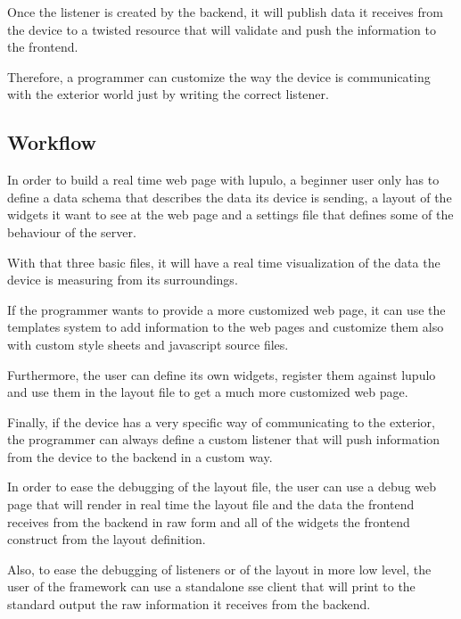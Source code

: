 \documentclass[12pt]{article}
\begin{document}
            Once the listener is created by the backend, it will publish data it
            receives from the device to a twisted resource that will validate
            and push the information to the frontend.

            Therefore, a programmer can customize the way the device is
            communicating with the exterior world just by writing the correct
            listener.

        \subsection{Workflow}
            In order to build a real time web page with lupulo, a beginner user
            only has to define a data schema that describes the data its device
            is sending, a layout of the widgets it want to see at the web page
            and a settings file that defines some of the behaviour of the
            server.

            With that three basic files, it will have a real time visualization
            of the data the device is measuring from its surroundings.

            If the programmer wants to provide a more customized web page, it
            can use the templates system to add information to the web pages and
            customize them also with custom style sheets and javascript source
            files.

            Furthermore, the user can define its own widgets, register them
            against lupulo and use them in the layout file to get a much more
            customized web page.

            Finally, if the device has a very specific way of communicating to
            the exterior, the programmer can always define a custom listener
            that will push information from the device to the backend in a
            custom way.

            In order to ease the debugging of the layout file, the user can use
            a debug web page that will render in real time the layout file and
            the data the frontend receives from the backend in raw form and all
            of the widgets the frontend construct from the layout definition.

            Also, to ease the debugging of listeners or of the layout in more
            low level, the user of the framework can use a standalone sse client
            that will print to the standard output the raw information it
            receives from the backend.
\end{document}
